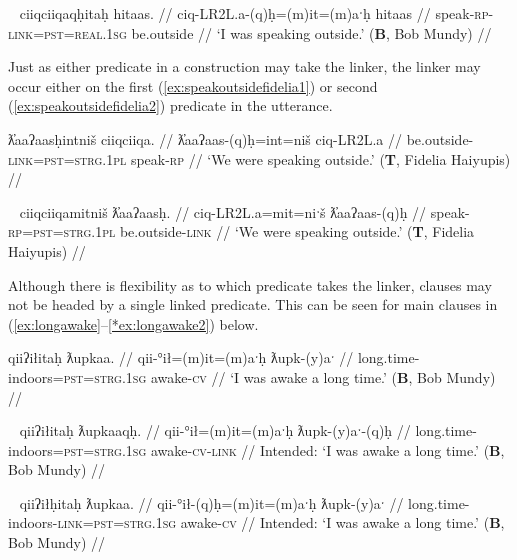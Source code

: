 \ex~ \label{ex:speakoutsidebob2}
\begingl
\glpreamble ciiqciiqaqḥitaḥ hitaas. //
\gla ciq-LR2L.a-(q)ḥ=(m)it=(m)aˑḥ  hitaas  //
\glb speak-\textsc{rp}-\textsc{link}=\textsc{pst}=\textsc{real.1sg} be.outside //
\glft `I was speaking outside.' (\textbf{B}, Bob Mundy) //
\endgl
\xe

Just as either predicate in a construction may take the linker, the linker may occur either on the first (\ref{ex:speakoutsidefidelia1}) or second (\ref{ex:speakoutsidefidelia2}) predicate in the utterance.

\ex \label{ex:speakoutsidefidelia1}
\begingl
\glpreamble ƛ̓aaʔaasḥintniš ciiqciiqa. //
\gla ƛ̓aaʔaas-(q)ḥ=int=niš ciq-LR2L.a //
\glb be.outside-\textsc{link}=\textsc{pst}=\textsc{strg.1pl} speak-\textsc{rp} //
\glft `We were speaking outside.' (\textbf{T}, Fidelia Haiyupis) //
\endgl
\xe

\ex~ \label{ex:speakoutsidefidelia2}
\begingl
\glpreamble ciiqciiqamitniš ƛ̓aaʔaasḥ. //
\gla ciq-LR2L.a=mit=niˑš ƛ̓aaʔaas-(q)ḥ //
\glb speak-\textsc{rp}=\textsc{pst}=\textsc{strg.1pl} be.outside-\textsc{link} //
\glft `We were speaking outside.' (\textbf{T}, Fidelia Haiyupis) //
\endgl
\xe

Although there is flexibility as to which predicate takes the linker, clauses may not be headed by a single linked predicate. This can be seen for main clauses in (\ref{ex:longawake}--\ref{*ex:longawake2}) below.

\ex \label{ex:longawake}
\begingl
\glpreamble qiiʔiłitaḥ ƛupkaa. //
\gla qii-°ił=(m)it=(m)aˑḥ ƛupk-(y)aˑ //
\glb long.time-indoors=\textsc{pst}=\textsc{strg.1sg} awake-\textsc{cv} //
\glft `I was awake a long time.' (\textbf{B}, Bob Mundy) //
\endgl
\xe

\ex~ \label{*ex:longawake1}
\begingl
\glpreamble *qiiʔiłitaḥ ƛupkaaqḥ. //
\gla qii-°ił=(m)it=(m)aˑḥ ƛupk-(y)aˑ-(q)ḥ //
\glb long.time-indoors=\textsc{pst}=\textsc{strg.1sg} awake-\textsc{cv}-\textsc{link} //
\glft Intended: `I was awake a long time.' (\textbf{B}, Bob Mundy) //
\endgl
\xe

\ex~ \label{*ex:longawake2}
\begingl
\glpreamble *qiiʔiłḥitaḥ ƛupkaa. //
\gla qii-°ił-(q)ḥ=(m)it=(m)aˑḥ ƛupk-(y)aˑ //
\glb long.time-indoors-\textsc{link}=\textsc{pst}=\textsc{strg.1sg} awake-\textsc{cv} //
\glft Intended: `I was awake a long time.' (\textbf{B}, Bob Mundy) //
\endgl
\xe

\begin{comment}
\ex \label{ex:longawake}
\begingl
\glpreamble qiiʔiłs ƛupkaaqḥ. //
\gla qiiʔił=s ƛupk-(y)aˑ-(q)ḥ //
\glb lie.in.bed.a.long.time=\textsc{strg.1sg} awake-\textsc{dr}-\textsc{link} //
\glft `I lay awake inside for a long time.' (\textbf{T}, \textit{yuułnaak} Simon Lucas) //
\endgl
\xe

\ex~ \label{*ex:longawake}
\begingl
\glpreamble *ƛupkaaqḥs qii. //
\gla ƛupk-(y)aˑ-(q)ḥ=s qii //
\glb awake-\textsc{dr}-\textsc{link}=\textsc{strg.1sg} long.time //
\glft Intended: `I lay awake for a long time.' (\textbf{T}, \textit{yuułnaak} Simon Lucas) //
\endgl
\xe
\end{comment}

